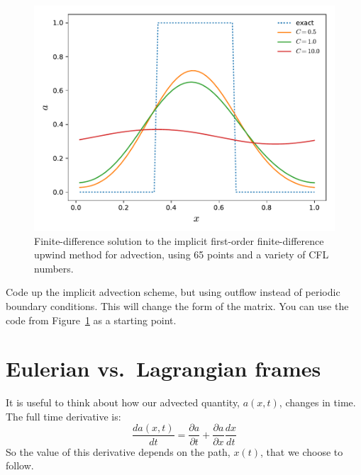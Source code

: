 \begin{figure}[t]
\centering
\includegraphics[width=0.8\linewidth]{fdadvect-implicit}
\caption[First-order implicit finite-difference solution to linear advection]
{\label{fig:fdadvect-implicit} Finite-difference solution to the implicit first-order
finite-difference upwind method for advection, using 65 points and
a variety of CFL numbers. \\
}
\end{figure}

\begin{exercise}
{Code up the implicit advection scheme, but using outflow instead of
periodic boundary conditions.  This will change the form of the
matrix.  You can use the code from Figure~\ref{fig:fdadvect-implicit}
as a starting point.}
\end{exercise}


\section{Eulerian vs.\ Lagrangian frames}

It is useful to think about how our advected quantity, $a(x,t)$, changes in
time.  The full time derivative is:
\begin{equation}
\frac{d a(x,t)}{dt} = \frac{\partial a}{\partial t} + \frac{\partial a}{\partial x}
   \frac{dx}{dt}
\end{equation}
So the value of this derivative depends on the path, $x(t)$, that we choose
to follow.  

